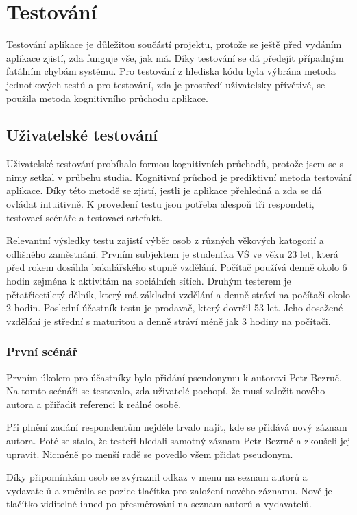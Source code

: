 
\chapter{Testování}
        Testování aplikace je důležitou součástí projektu, protože se ještě před vydáním aplikace zjistí, zda funguje vše, jak má. Díky testování se dá předejít případným fatálním chybám systému. Pro testování z hlediska kódu byla výbrána metoda jednotkových testů a pro testování, zda je prostředí uživatelsky přívětivé, se použila metoda kognitivního průchodu aplikace.
        
    \section{Uživatelské testování}
        Uživatelské testování probíhalo formou kognitivních průchodů, protože jsem se s nimy setkal v průbehu studia. Kognitivní průchod je prediktivní metoda testování aplikace. Díky této metodě se zjistí, jestli je aplikace přehledná a zda se dá ovládat intuitivně. K provedení testu jsou potřeba alespoň tři respondeti, testovací scénáře a testovací artefakt. 
        
        Relevantní výsledky testu zajistí výběr osob z různých věkových katogorií a odlišného zaměstnání. Prvním subjektem je studentka VŠ ve věku 23 let, která před rokem dosáhla bakalářského stupně vzdělání. Počítač používá denně okolo 6 hodin zejména k aktivitám na sociálních sítích. Druhým testerem je pětatřicetiletý dělník, který má základní vzdělání a denně stráví na počítači okolo 2 hodin. Poslední účastník testu je prodavač, který dovršil 53 let. Jeho dosažené vzdělání je střední s maturitou a denně stráví méně jak 3 hodiny na počítači.
        
        \subsection{První scénář}
            Prvním úkolem pro účastníky bylo přidání pseudonymu k autorovi Petr Bezruč. Na tomto scénáři se testovalo, zda uživatelé pochopí, že musí založit nového autora a přiřadit referenci k reálné osobě.
            
            Při plnění zadání respondentům nejdéle trvalo najít, kde se přidává nový záznam autora. Poté se stalo, že testeři hledali samotný záznam Petr Bezruč a zkoušeli jej upravit. Nicméně po menší radě se povedlo všem přidat pseudonym.
            
            Díky připomínkám osob se zvýraznil odkaz v menu na seznam autorů a vydavatelů a změnila se pozice tlačítka pro založení nového záznamu. Nově je tlačítko viditelné ihned po přesměrování na seznam autorů a vydavatelů. 

